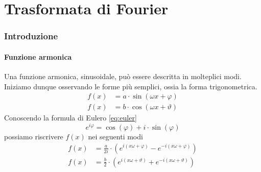 \part{Trasformata di Fourier}

\section{Introduzione}
\subsection{Funzione armonica}
Una funzione armonica, sinusoidale, pu\`o essere descritta in molteplici modi.
Iniziamo dunque osservando le forme pi\`u semplici, ossia la forma
trigonometrica.
\begin{align} \label{eq:harmonics-trig}
    f(x) &= a\cdot\sin (\omega x + \varphi) \\
    f(x) &= b\cdot\cos(\omega x + \vartheta)
\end{align}
Conoscendo la formula di Eulero \eqref{eq:euler}
\begin{equation} \label{eq:euler}
    e^{i\varphi} = \cos(\varphi) + i\cdot\sin(\varphi)
\end{equation}
possiamo riscrivere \(f(x)\) nei seguenti modi
\begin{align} \label{eq:harmonics-complex}
    f(x) &= \frac{a}{2i}\cdot(e^{i(x\omega + \varphi)} - e^{-i(x\omega + \varphi)}) \\
    f(x) &= \frac{b}{2}\cdot(e^{i(x\omega + \vartheta)} + e^{-i(x\omega + \vartheta)})
\end{align}


